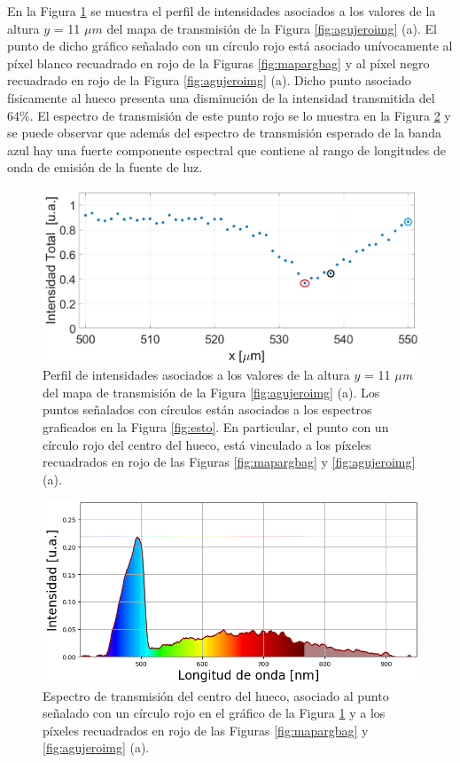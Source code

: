 En la Figura \ref{fig:perfilbacka} se muestra el perfil de intensidades asociados a los valores de la altura $\textit{y}$ = 11 $\mu m$ del mapa de transmisión de la Figura \ref{fig:agujeroimg} (a). El punto de dicho gráfico señalado con un círculo rojo está asociado unívocamente al píxel blanco recuadrado en rojo de la Figuras \ref{fig:mapargbag} y al píxel negro recuadrado en rojo de la Figura \ref{fig:agujeroimg} (a). Dicho punto asociado físicamente al hueco presenta una disminución de la intensidad transmitida del 64\%. El espectro de transmisión de este punto rojo se lo muestra en la Figura \ref{fig:espectbag} y se puede observar que además del espectro de transmisión esperado de la banda azul hay una fuerte componente espectral que contiene al rango de longitudes de onda de emisión de la fuente de luz. 

 \begin{figure}[H]
	\centering
	\includegraphics[width=1.0\textwidth]{Figs/microespectrometro/inten_totaldefecto.png}
	\caption{Perfil de intensidades asociados a los valores de la altura $\textit{y}$ = 11 $\mu m$ del mapa de transmisión de la Figura \ref{fig:agujeroimg} (a). Los puntos señalados con círculos están asociados a los espectros graficados en la Figura \ref{fig:esto}. En particular, el punto con un círculo rojo del centro del hueco, está vinculado a los píxeles recuadrados en rojo de las Figuras \ref{fig:mapargbag} y \ref{fig:agujeroimg} (a). }
	\label{fig:perfilbacka}
\end{figure}

\begin{figure}[H]
	\centering
\includegraphics[width=1.0\textwidth]{Figs/microespectrometro/espectroagback.png}
	\caption{Espectro de transmisión del centro del hueco, asociado al punto señalado con un círculo rojo en el gráfico de la Figura \ref{fig:perfilbacka} y a los píxeles recuadrados en rojo de las Figuras \ref{fig:mapargbag} y \ref{fig:agujeroimg} (a).}
\label{fig:espectbag}
\end{figure}

